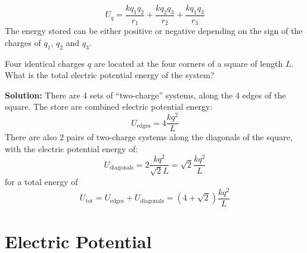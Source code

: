\begin{equation}
  U_q=\frac{kq_1q_2}{r_1} +\frac{kq_2q_3}{r_2} +\frac{kq_1q_3}{r_3}
\end{equation}
The energy stored can be either positive or negative depending on the sign of
the charges of $q_1$, $q_2$ and $q_3$.


\begin{example}
  Four identical charges $q$ are located at the four corners of a square of
  length $L$. What is the total electric potential energy of the system?
  \begin{center}
    \vspace{-.1in}
  \end{center}
  \textbf{Solution:} There are 4 sets of ``two-charge'' systems, along the 4
  edges of the square. The store are combined electric potential energy:
  \begin{displaymath}
    U_\text{edges}=4\frac{kq^2}L
  \end{displaymath}
  There are also 2 pairs of two-charge systems along the diagonals of the
  square, with the electric potential energy of:
  \begin{displaymath}
    U_\text{diagonals}=2\frac{kq^2}{\sqrt2L}=\sqrt2\frac{kq^2}L
  \end{displaymath}
  for a total energy of
  \begin{displaymath}
    U_\text{tot}=U_\text{edges}+U_\text{diagonals}=(4+\sqrt2)\frac{kq^2}L
  \end{displaymath}
\end{example}



\section{Electric Potential}

